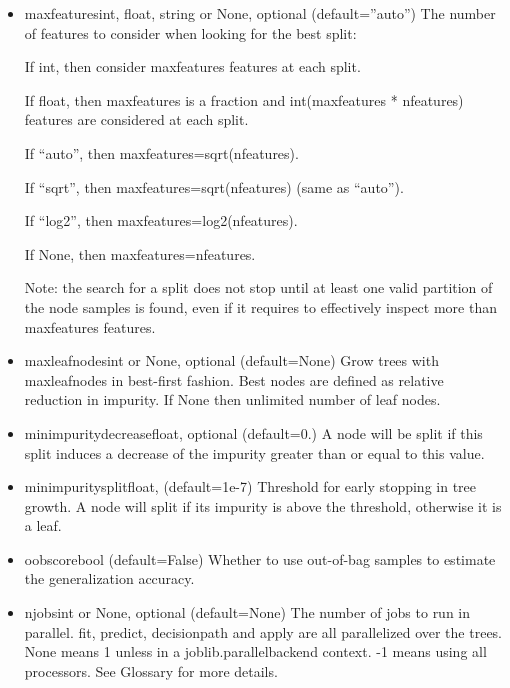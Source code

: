 \documentclass[12pt]{article}
\begin{document}
\begin{itemize}
\item
max\textunderscore featuresint, float, string or None, optional (default=”auto”)
The number of features to consider when looking for the best split:

If int, then consider max\textunderscore features features at each split.

If float, then max\textunderscore features is a fraction and int(max\textunderscore features * n\textunderscore features) features are considered at each split.

If “auto”, then max\textunderscore features=sqrt(n\textunderscore features).

If “sqrt”, then max\textunderscore features=sqrt(n\textunderscore features) (same as “auto”).

If “log2”, then max\textunderscore features=log2(n\textunderscore features).

If None, then max\textunderscore features=n\textunderscore features.

Note: the search for a split does not stop until at least one valid partition of the node samples is found, even if it requires to effectively inspect more than max\textunderscore features features.

\item
max\textunderscore leaf\textunderscore nodesint or None, optional (default=None)
Grow trees with max\textunderscore leaf\textunderscore nodes in best-first fashion. Best nodes are defined as relative reduction in impurity. If None then unlimited number of leaf nodes.

\item
min\textunderscore impurity\textunderscore decreasefloat, optional (default=0.)
A node will be split if this split induces a decrease of the impurity greater than or equal to this value.

\item
min\textunderscore impurity\textunderscore splitfloat, (default=1e-7)
Threshold for early stopping in tree growth. A node will split if its impurity is above the threshold, otherwise it is a leaf.

\item
oob\textunderscore scorebool (default=False)
Whether to use out-of-bag samples to estimate the generalization accuracy.

\item
n\textunderscore jobsint or None, optional (default=None)
The number of jobs to run in parallel. fit, predict, decision\textunderscore path and apply are all parallelized over the trees. None means 1 unless in a joblib.parallel\textunderscore backend context. -1 means using all processors. See Glossary for more details.


\end{itemize}
\end{document}
